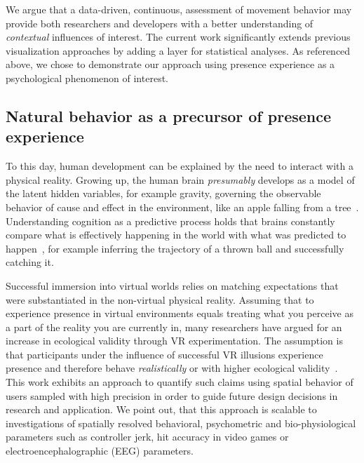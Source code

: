 We argue that a data-driven, continuous, assessment of movement behavior may provide both researchers and developers with a better understanding of \textit{contextual} influences of interest. The current work significantly extends previous visualization approaches by adding a layer for statistical analyses. As referenced above, we chose to demonstrate our approach using presence experience as a psychological phenomenon of interest.

\subsection{Natural behavior as a precursor of presence experience}
To this day, human development can be explained by the need to interact with a physical reality. Growing up, the human brain \textit{presumably} develops as a model of the latent hidden variables, for example gravity, governing the observable behavior of cause and effect in the environment, like an apple falling from a tree~\cite{Friston2010}. Understanding cognition as a predictive process holds that brains constantly compare what is effectively happening in the world with what was predicted to happen~\cite{Clark2013}, for example inferring the trajectory of a thrown ball and successfully catching it. 

Successful immersion into virtual worlds relies on matching expectations that were substantiated in the non-virtual physical reality. Assuming that to experience presence in virtual environments equals treating what you perceive as a part of the reality you are currently in, many researchers have argued for an increase in ecological validity through VR experimentation. The assumption is that participants under the influence of successful VR illusions experience presence and therefore behave \textit{realistically} or with higher ecological validity~\cite{Tarr2002, Bohil2011, Parsons2015, Parsons2017}. This work exhibits an approach to quantify such claims using spatial behavior of users sampled with high precision in order to guide future design decisions in research and application. We point out, that this approach is scalable to investigations of spatially resolved behavioral, psychometric and bio-physiological parameters such as controller jerk, hit accuracy in video games or electroencephalographic (EEG) parameters.

